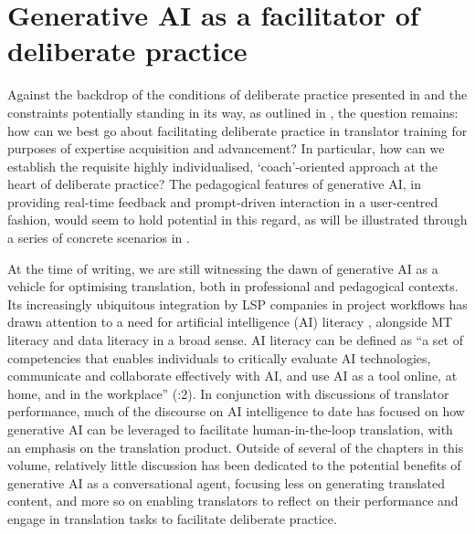 \documentclass[output=paper]{langscibook}
\begin{document}
\section{Generative AI as a facilitator of deliberate practice}\label{sec:2:4}

Against the backdrop of the conditions of deliberate practice presented in  and the constraints potentially standing in its way, as outlined in , the question remains: how can we best go about facilitating deliberate practice in translator training for purposes of expertise acquisition and advancement? In particular, how can we establish the requisite highly individualised, ‘coach’-oriented approach at the heart of deliberate practice? The pedagogical features of generative AI, in providing real-time feedback and prompt-driven interaction in a user-centred fashion, would seem to hold potential in this regard, as will be illustrated through a series of concrete scenarios in .

At the time of writing, we are still witnessing the dawn of generative AI as a vehicle for optimising translation, both in professional and pedagogical contexts. Its increasingly ubiquitous integration by LSP companies in project workflows has drawn attention to a need for artificial intelligence (AI) literacy \citep{kruger23_AI_literacy}, alongside MT literacy and data literacy in a broad sense. AI literacy can be defined as “a set of competencies that enables individuals to critically evaluate AI technologies, communicate and collaborate effectively with AI, and use AI as a tool online, at home, and in the workplace” (\citealt{longmagerko2020}:2). In conjunction with discussions of translator performance, much of the discourse on AI intelligence to date has focused on how generative AI can be leveraged to facilitate human-in-the-loop translation, with an emphasis on the translation product. Outside of several of the chapters in this volume, relatively little discussion has been dedicated to the potential benefits of generative AI as a conversational agent, focusing less on generating translated content, and more so on enabling translators to reflect on their performance and engage in translation tasks to facilitate deliberate practice.
\end{document}
